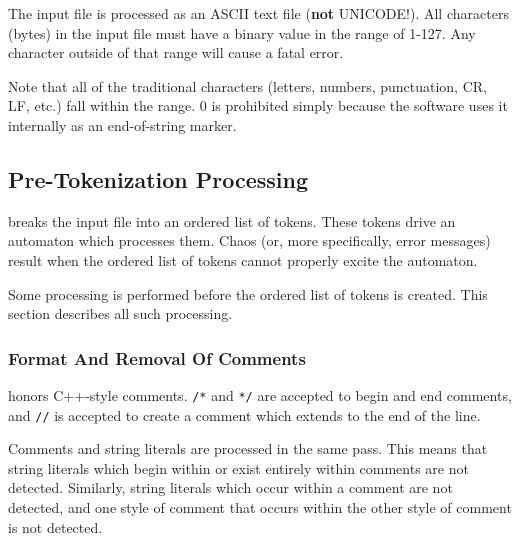 The input file is processed as an ASCII text file (\textbf{not} UNICODE!).
All characters (bytes) in the input file must have a binary value in the range
of 1-127.  Any character outside of that range will cause a fatal error.

Note that all of the traditional characters (letters, numbers, punctuation, 
CR, LF, etc.) fall within the range.  0 is prohibited simply because the software
uses it internally as an end-of-string marker.


\subsection{Pre-Tokenization Processing}
\label{siff0:sptp0}

\swname{} breaks the input file into an ordered list of tokens.  These tokens
drive an automaton which processes them.  Chaos (or, more specifically, error
messages) result when the ordered list of tokens cannot properly excite
the automaton.

Some processing is performed before the ordered list of tokens is created.  This
section describes all such processing.


\subsubsection{Format And Removal Of Comments}
\label{siff0:sptp0:sfrc0}

\swname{} honors C++-style comments.  \texttt{/*} and \texttt{*/} are
accepted to begin and end comments, and \texttt{//} is accepted to
create a comment which extends to the end of the line.

Comments and string literals are processed in the same pass.
This means that string literals which begin within or exist entirely within
comments are not detected.  Similarly, string literals which occur within a comment
are not detected, and one style of comment that occurs within the other style of
comment is not detected.


